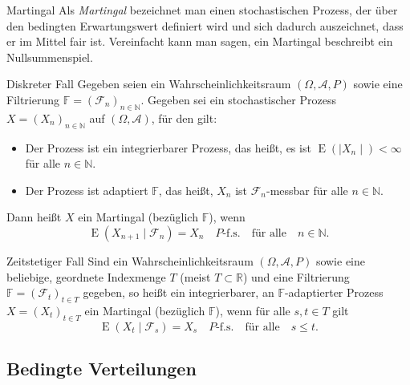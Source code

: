 \begin{defi}{Martingal}
    Als \emph{Martingal} bezeichnet man einen stochastischen Prozess, der über den bedingten Erwartungswert definiert wird und sich dadurch auszeichnet, dass er im Mittel fair ist.
    Vereinfacht kann man sagen, ein Martingal beschreibt ein Nullsummenspiel.
\end{defi}

\begin{defi}[Martingal]{Diskreter Fall}
    Gegeben seien ein Wahrscheinlichkeitsraum $(\Omega ,{\mathcal{A}},P)$ sowie eine Filtrierung $\mathbb{F} =({\mathcal{F}}_{n})_{n\in \mathbb{N}}$.
    Gegeben sei ein stochastischer Prozess $X=(X_{n})_{n\in \mathbb{N}}$ auf $(\Omega ,{\mathcal{A}})$, für den gilt:
    \begin{itemize}
        \item Der Prozess ist ein integrierbarer Prozess, das heißt, es ist $\operatorname{E} (\mid X_{n}\mid)<\infty$ für alle $n\in \mathbb{N}$.
        \item Der Prozess ist adaptiert $\mathbb{F}$, das heißt, $X_{n}$ ist $\mathcal{F}_{n}$-messbar für alle $n\in \mathbb{N}$.
    \end{itemize}

    Dann heißt $X$ ein Martingal (bezüglich $\mathbb{F}$), wenn
    \[
        \operatorname{E} (X_{n+1}\mid \mathcal{F}_{n})=X_{n} \quad P\text{-f.s.} \quad \text{für alle} \quad n\in \mathbb{N}.
    \]
\end{defi}

\begin{defi}[Martingal]{Zeitstetiger Fall}
    Sind ein Wahrscheinlichkeitsraum $(\Omega ,{\mathcal{A}},P)$ sowie eine beliebige, geordnete Indexmenge $T$ (meist $T\subset \mathbb{R}$) und eine Filtrierung $\mathbb{F} =({\mathcal{F}}_{t})_{t\in T}$ gegeben, so heißt ein integrierbarer, an $\mathbb{F}$-adaptierter Prozess $X=(X_{t})_{t\in T}$ ein Martingal (bezüglich $\mathbb{F}$), wenn für alle $s,t\in T$ gilt
    \[
        \operatorname{E} (X_{t}\mid \mathcal{F}_{s})=X_{s} \quad P\text{-f.s.} \quad \text{für alle} \quad s\leq t.
    \]
\end{defi}

\subsection{Bedingte Verteilungen}

